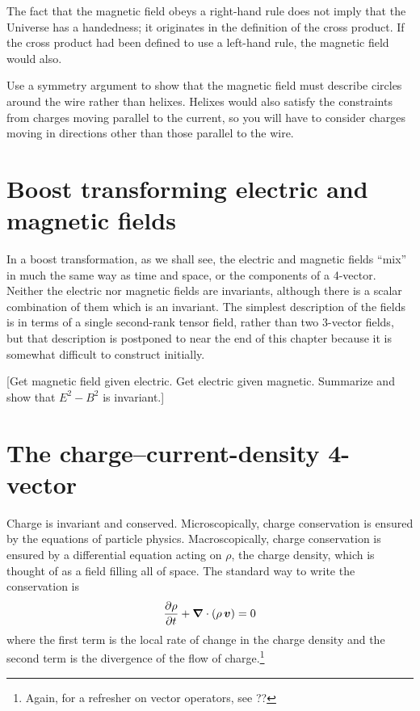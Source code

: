 The fact that the magnetic field obeys a right-hand rule does not
imply that the Universe has a handedness; it originates in the
definition of the cross product.  If the cross product had been
defined to use a left-hand rule, the magnetic field would also.

\begin{problem}
Use a symmetry argument to show that the magnetic field must describe
circles around the wire rather than helixes.  Helixes would also
satisfy the constraints from charges moving parallel to the current,
so you will have to consider charges moving in directions other than
those parallel to the wire.
\end{problem}


\section{Boost transforming electric and magnetic fields}

In a boost transformation, as we shall see, the electric and magnetic
fields ``mix'' in much the same way as time and space, or the
components of a 4-vector.  Neither the electric nor magnetic fields
are invariants, although there is a scalar combination of them which
is an invariant.  The simplest description of the fields is in terms
of a single second-rank tensor field, rather than two 3-vector fields,
but that description is postponed to near the end of this chapter
because it is somewhat difficult to construct initially.

[Get magnetic field given electric.  Get electric given magnetic.
Summarize and show that $E^2-B^2$ is invariant.]


\section{The charge--current-density 4-vector}

Charge is invariant and conserved.  Microscopically, charge
conservation is ensured by the equations of particle physics.
Macroscopically, charge conservation is ensured by a differential
equation acting on $\rho$, the charge density, which is thought of as
a field filling all of space.  The standard way to write the
conservation is
\begin{equation}
\frac{\partial\rho}{\partial t}+\mbox{\boldmath $\nabla$}\cdot(\rho\,\mbox{\boldmath $v$})=0
\end{equation}
where the first term is the local rate of change in the charge density
and the second term is the divergence of the flow of
charge.\footnote{Again, for a refresher on vector operators, see ??}

